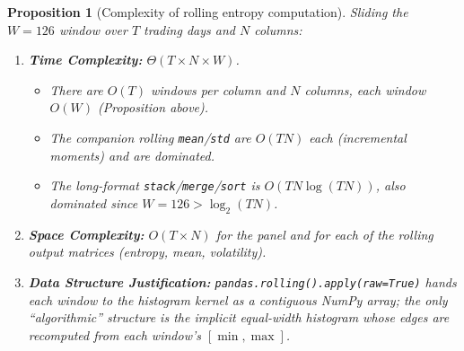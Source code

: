 \documentclass[a4paper,12pt]{article}
\newtheorem{proposition}{Proposition}[section]
\begin{document}
\begin{proposition}[Complexity of rolling entropy computation]
Sliding the $W=126$ window over $T$ trading days and $N$ columns:
\begin{enumerate}[label=(\roman*)]
    \item \textbf{Time Complexity:} $\Theta(T \times N \times W)$.
    \begin{itemize}
        \item There are $O(T)$ windows per column and $N$ columns, each window $O(W)$ (Proposition above).
        \item The companion rolling \texttt{mean}/\texttt{std} are $O(TN)$ each (incremental moments) and are dominated.
        \item The long-format \texttt{stack}/\texttt{merge}/\texttt{sort} is $O(TN\log(TN))$, also dominated since $W=126>\log_2(TN)$.
    \end{itemize}
    \item \textbf{Space Complexity:} $O(T \times N)$ for the panel and for each of the rolling output matrices (entropy, mean, volatility).
    \item \textbf{Data Structure Justification:} \texttt{pandas.rolling().apply(raw=True)} hands each window to the histogram kernel as a contiguous NumPy array; the only ``algorithmic'' structure is the implicit equal-width histogram whose edges are recomputed from each window's $[\min,\max]$.
\end{enumerate}
\end{proposition}
\end{document}

